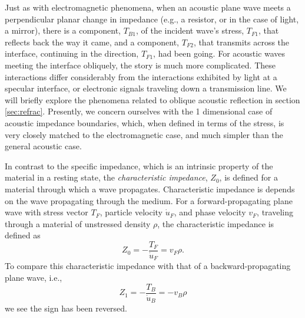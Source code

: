 \documentclass[a4paper,10pt]{report}
\numberwithin{equation}{section}
\begin{document}
Just as with electromagnetic phenomena, when an acoustic plane wave meets a perpendicular planar change in impedance (e.g., a resistor, or in the case of light, a mirror), there is a component, $T_{B1}$, of the incident wave's stress, $T_{F1}$, that reflects back the way it came, and a component, $T_{F2}$, that transmits across the interface, continuing in the direction, $T_{F1}$, had been going. For acoustic waves meeting the interface obliquely, the story is much more complicated. These interactions differ considerably from the interactions exhibited by light at a specular interface, or electronic signals traveling down a transmission line. We will briefly explore the phenomena related to oblique acoustic reflection in section \ref{sec:refrac}. Presently, we concern ourselves with the 1 dimensional case of acoustic impedance boundaries, which, when defined in terms of the stress, is very closely matched to the electromagnetic case, and much simpler than the general acoustic case.

In contrast to the specific impedance, which is an intrinsic property of the material in a resting state, the \emph{characteristic impedance}, $Z_0$, is defined for a material through which a wave propagates. Characteristic impedance is depends on the wave propagating through the medium. For a forward-propagating plane wave with stress vector $T_F$, particle velocity $\dot{u}_F$, and phase velocity $v_F$, traveling through a material of unstressed density $\rho$, the characteristic impedance is defined as
\begin{equation}\label{z0F}
 Z_0 = -\frac{T_F}{\dot{u}_F} = v_F \rho \text{.}
\end{equation}
To compare this characteristic impedance with that of a backward-propagating plane wave, i.e.,
\begin{equation}\label{z0B}
Z_1 = -\frac{T_B}{\dot{u}_B} = -v_B \rho
\end{equation}
we see the sign has been reversed.
\end{document}
